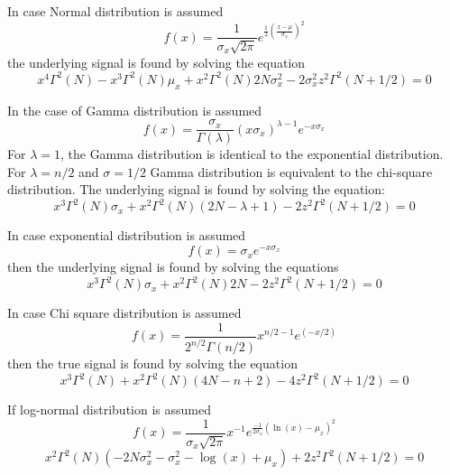 In case Normal distribution is assumed \cite{Medeiros_1998_IAI}
\begin{equation}
f(x) = \frac{1}{\sigma_x \sqrt{2 \pi} } e^{\frac{1}{2} \left( \frac{x-\mu}{\sigma_x} \right)^2 }
\end{equation}
the underlying signal is found by solving the equation
\begin{equation}
x^4 \Gamma^2(N) - x^3 \Gamma^2(N) \mu_x + x^2 \Gamma^2(N) 2N \sigma^2_x - 2 \sigma^2_x z^2 \Gamma^2(N+1/2) = 0
\end{equation}

In the case of Gamma distribution is assumed \cite{Lopes_1990_IGARSS} 
\begin{equation}
f(x) = \frac{\sigma_x}{\Gamma(\lambda)} (x \sigma_x )^{\lambda-1} e^{-x \sigma_x}
\end{equation}
For $\lambda=1$, the Gamma distribution is identical to the exponential distribution. 
For $\lambda=n/2$ and $\sigma=1/2$ Gamma distribution is equivalent to the chi-square distribution.
The underlying signal is found by solving the equation:
\begin{equation}
x^3 \Gamma^2(N) \sigma_x + x^2 \Gamma^2(N) (2N - \lambda + 1) - 2 z^2 \Gamma^2(N+1/2) = 0
\end{equation}

In case exponential distribution is assumed 
\begin{equation}
 f(x) = \sigma_x e^{-x \sigma_x}
\end{equation}
then the underlying signal is found by solving the equations
\begin{equation}
 x^3 \Gamma^2(N) \sigma_x + x^2 \Gamma^2(N) 2N - 2 z^2 \Gamma^2(N+1/2) = 0
\end{equation}

In case Chi square distribution is assumed 
\begin{equation}
 f(x)=\frac{1}{2^{n/2} \Gamma(n/2)} x^{n/2-1} e^{(-x/2)}
\end{equation}
then the true signal is found by solving the equation
\begin{equation}
 x^3 \Gamma^2(N) + x^2 \Gamma^2(N) (4N-n+2) - 4 z^2 \Gamma^2(N+1/2) = 0
\end{equation}

If log-normal distribution is assumed \cite{Medeiros_2003_IntJRemoteSens}
\begin{equation}
 f(x) = \frac{1}{\sigma_x \sqrt{2 \pi}} x^{-1} e^{\frac{-1}{2 \sigma_x} (\ln(x) - \mu_x)^2}
\end{equation}
\begin{equation}
 x^2 \Gamma^2(N) (-2N \sigma^2_x - \sigma^2_x -\log(x) + \mu_x) + 2 z^2 \Gamma^2(N+1/2)=0
\end{equation}

